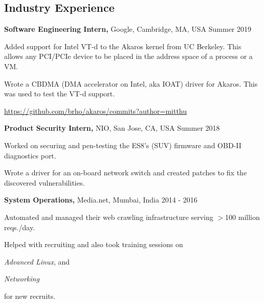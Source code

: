 \documentclass[margin]{res}
\begin{document}
\begin{resume}
\section{Industry Experience}

{\bf Software Engineering Intern,} Google, Cambridge, MA, USA
\hfill Summer  2019 %
\begin{itemizeexp}
    \item Added support for Intel VT-d to the Akaros kernel from UC Berkeley.
    This allows any PCI/PCIe device to be placed in the address space of a process or a VM.
    \item Wrote a CBDMA (DMA accelerator on Intel, aka IOAT) driver for Akaros.
    This was used to test the VT-d support.
    \item \url{https://github.com/brho/akaros/commits?author=mitthu}
\end{itemizeexp}

{\bf Product Security Intern,} NIO, San Jose, CA, USA
\hfill Summer 2018 %
\begin{itemizeexp}
    \item Worked on securing and pen-testing the ES8's (SUV) firmware and
    OBD-II diagnostics port.
    \item Wrote a driver for an on-board network switch and created patches
    to fix the discovered vulnerabilities.
\end{itemizeexp}

{\bf System Operations,} Media.net, Mumbai, India
\hfill 2014 - 2016 %
\begin{itemizeexp}
    \item Automated and managed their web crawling infrastructure serving
    $>$100 million reqs./day.
    \item Helped with recruiting and also took training sessions on 
    \begin{enumerate*}[label=(\roman*)]
      \item \textit{Advanced Linux}, and
      \item \textit{Networking}
    \end{enumerate*}
    for new recruits.
\end{itemizeexp}


\end{resume}
\end{document}

